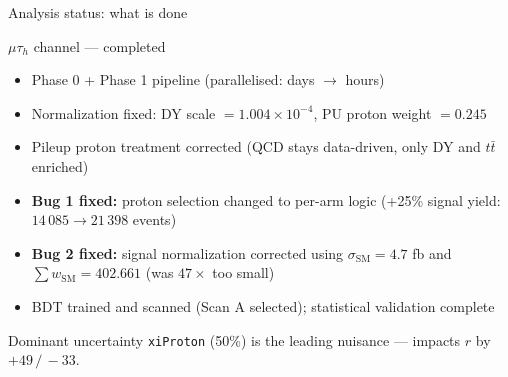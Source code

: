 \begin{frame}[fragile]{Analysis status: what is done}
\protect{}\label{analysis-status-what-is-done}
\begin{block}{\(\mu\tau_h\) channel --- completed}
\protect{}\label{mutau_h-channel-completed}
\begin{itemize}
\tightlist
\item
  Phase 0 + Phase 1 pipeline (parallelised: days \(\to\) hours)
\item
  Normalization fixed: DY scale \(= 1.004\times10^{-4}\), PU proton
  weight \(= 0.245\)
\item
  Pileup proton treatment corrected (QCD stays data-driven, only DY and
  \(t\bar{t}\) enriched)
\item
  \textbf{Bug 1 fixed:} proton selection changed to per-arm logic (+25\%
  signal yield: \(14\,085 \to 21\,398\) events)
\item
  \textbf{Bug 2 fixed:} signal normalization corrected using
  \(\sigma_\text{SM} = 4.7\) fb and \(\sum w_\text{SM} = 402.661\) (was
  \(47\times\) too small)
\item
  BDT trained and scanned (Scan A selected); statistical validation
  complete
\end{itemize}
\end{block}

\begin{block}{Dominant uncertainty}
\protect{}\label{dominant-uncertainty}
\texttt{xiProton} (50\%) is the leading nuisance --- impacts \(r\) by
\(+49\,/\,-33\).
\end{block}
\end{frame}


